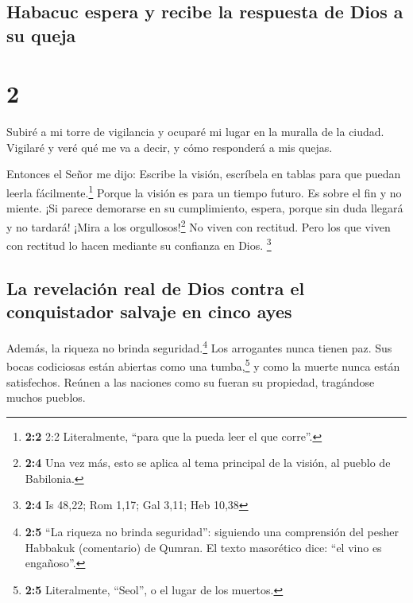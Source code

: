 \hypertarget{habacuc-espera-y-recibe-la-respuesta-de-dios-a-su-queja}{%
\subsection{Habacuc espera y recibe la respuesta de Dios a su
queja}\label{habacuc-espera-y-recibe-la-respuesta-de-dios-a-su-queja}}

\hypertarget{section-1}{%
\section{2}\label{section-1}}

 Subiré a mi torre de vigilancia y ocuparé mi lugar en la
muralla de la ciudad. Vigilaré y veré qué me va a decir, y cómo
responderá a mis quejas.

 Entonces el Señor me dijo: Escribe la visión, escríbela
en tablas para que puedan leerla fácilmente.\footnote{\textbf{2:2} 2:2
  Literalmente, ``para que la pueda leer el que corre''.} 
Porque la visión es para un tiempo futuro. Es sobre el fin y no miente.
¡Si parece demorarse en su cumplimiento, espera, porque sin duda llegará
y no tardará!  ¡Mira a los orgullosos!\footnote{\textbf{2:4}
  Una vez más, esto se aplica al tema principal de la visión, al pueblo
  de Babilonia.} No viven con rectitud. Pero los que viven con rectitud
lo hacen mediante su confianza en Dios. \footnote{\textbf{2:4} Is 48,22;
  Rom 1,17; Gal 3,11; Heb 10,38}

\hypertarget{la-revelaciuxf3n-real-de-dios-contra-el-conquistador-salvaje-en-cinco-ayes}{%
\subsection{La revelación real de Dios contra el conquistador salvaje en
cinco
ayes}\label{la-revelaciuxf3n-real-de-dios-contra-el-conquistador-salvaje-en-cinco-ayes}}

 Además, la riqueza no brinda seguridad.\footnote{\textbf{2:5}
  ``La riqueza no brinda seguridad'': siguiendo una comprensión del
  pesher Habbakuk (comentario) de Qumran. El texto masorético dice: ``el
  vino es engañoso''.} Los arrogantes nunca tienen paz. Sus bocas
codiciosas están abiertas como una tumba,\footnote{\textbf{2:5}
  Literalmente, ``Seol'', o el lugar de los muertos.} y como la muerte
nunca están satisfechos. Reúnen a las naciones como su fueran su
propiedad, tragándose muchos pueblos.

